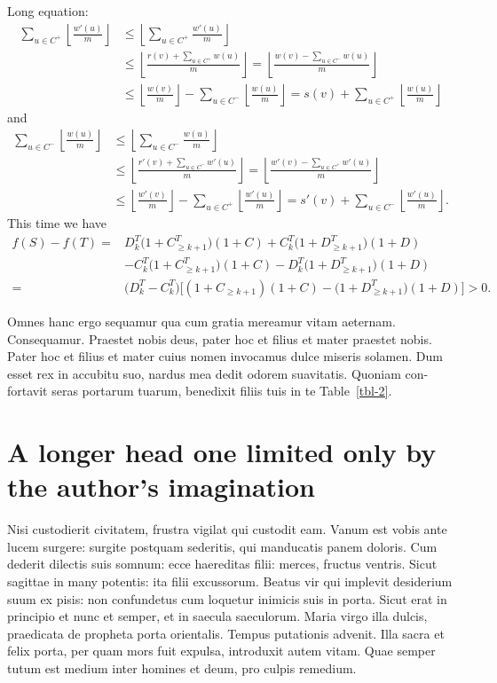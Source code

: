\documentclass[numbers,compress]{vmsta2}
\theoremstyle{definition}
\def\SM#1#2{\sum_{#1\in #2}}
\def\FL#1{\left\lfloor #1 \right\rfloor}
\def\FR#1#2{{\frac{#1}{#2}}}
\begin{document}
Long equation:
\begin{align}
\SM u{C^+}\FL{\FR{w'(u)}m} & \le \FL{\SM u{C^+} \FR{w'(u)}m}\nonumber\\
                           & \le \FL{\FR{r(v)+\SM u{C^+} w(u)}m} = \FL{\FR{w(v)-\SM u{C^-} w(u)}m}\nonumber \\
                           & \le \FL{\FR{w(v)}m}-\SM u{C^-}\FL{\FR{w(u)}m} = s(v)+\SM u{C^+}\FL{\FR{w(u)}m}
\end{align}
and
\begin{align}
\SM u{C^-}\FL{\FR{w(u)}m} & \le \FL{\SM u{C^-} \FR{w(u)}m}\nonumber\\
                          & \le \FL{\FR{r'(v)+\SM u{C^-} w'(u)}m} = \FL{\FR{w'(v)-\SM u{C^+} w'(u)}m}\nonumber \\
                          & \le \FL{\FR{w'(v)}m}-\SM u{C^+}\FL{\FR{w'(u)}m} = s'(v)+\SM u{C^-}\FL{\FR{w'(u)}m}.
\end{align}
This time we have
\begin{align}
f(S)-f(T) = {} & D_k^T\bigl(1+C_{\geq k+1}^T\bigr)(1 + C) + C_k^T\bigl(1+D_{\geq k+1}^T\bigr)(1 + D) \nonumber   \\
{}             & - C_k^T\bigl(1+C_{\geq k+1}^T\bigr)(1 + C) - D_k^T\bigl(1+D_{\geq k+1}^T\bigr)(1 + D) \nonumber \\
= {}           & \bigl(D_k^T-C_k^T\bigr)\bigl[(1+C_{\geq k+1})(1+C)-\bigl(1+D_{\geq k+1}^T\bigr)(1+D)\bigr]>0.
\end{align}

Omnes hanc ergo sequamur qua cum gratia mereamur vitam aeternam.
Consequamur. Praestet nobis deus, pater hoc et filius et mater
praestet nobis.  Pater hoc et filius et mater cuius nomen invocamus
dulce miseris solamen. Dum esset rex in accubitu suo, nardus mea
dedit odorem suavitatis. Quoniam con-fortavit seras portarum tuarum,
benedixit filiis tuis in te Table~\ref{tbl-2}.



\section{A longer head one limited only by the author's imagination}

Nisi custodierit civitatem, frustra vigilat qui custodit eam. Vanum
est vobis ante lucem surgere: surgite postquam sederitis, qui
manducatis panem doloris. Cum dederit dilectis suis somnum: ecce
haereditas filii: merces, fructus ventris. Sicut sagittae in many
potentis: ita filii excussorum. Beatus vir qui implevit desiderium
suum ex pisis: non confundetus cum loquetur inimicis suis in porta.
Sicut erat in principio et nunc et semper, et in saecula saeculorum.
Maria virgo illa dulcis, praedicata de propheta porta orientalis.
Tempus putationis advenit.  Illa sacra et felix porta, per quam mors
fuit expulsa, introduxit autem vitam.  Quae semper tutum est medium
inter homines et deum, pro culpis remedium.
\end{document}
